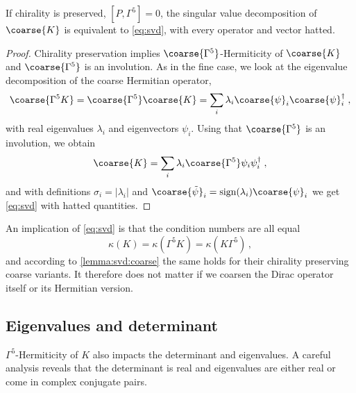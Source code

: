 \begin{lemma} \label{lemma:svd:coarse}
If chirality is preserved, $[P, \Gamma^5]=0$, the singular value decomposition of $\coarse{K}$ is equivalent to \cref{eq:svd}, with every operator and vector hatted.
\end{lemma}

\begin{proof}
Chirality preservation implies $\coarse{\Gamma^{5}}$-Hermiticity of $\coarse{K}$ and $\coarse{\Gamma^{5}}$ is an involution.
As in the fine case, we look at the eigenvalue decomposition of the coarse Hermitian operator,
\begin{equation}
\coarse{\Gamma^{5} K} = \coarse{\Gamma^{5}} \coarse{K} = \sum_{i} \lambda_i \coarse{\psi}_i \coarse{\psi}_i^{\dagger} \;,
\end{equation}
with real eigenvalues $\lambda_i$ and eigenvectors $\psi_i$. Using that $\coarse{\Gamma^{5}}$ is an involution, we obtain
\begin{equation}
\coarse{K} = \sum_{i} \lambda_i \coarse{\Gamma^{5}} \psi_i \psi_i^{\dagger} \;,
\end{equation}
and with definitions $\sigma_i = \lvert \lambda_i \rvert$ and $\coarse{\tilde{\psi}}_i = \text{sign}(\lambda_i) \coarse{\psi}_i$ we get \cref{eq:svd} with hatted quantities.
\end{proof}

An implication of \cref{eq:svd} is that the condition numbers are all equal
\begin{equation}
\kappa(K) = \kappa(\Gamma^{5} K) = \kappa(K \Gamma^{5}) \,,
\end{equation}
and according to \cref{lemma:svd:coarse} the same holds for their chirality preserving coarse variants.
It therefore does not matter if we coarsen the Dirac operator itself or its Hermitian version.

\subsection{Eigenvalues and determinant}

$\Gamma^{5}$-Hermiticity of $K$ also impacts the determinant and eigenvalues.
A careful analysis reveals that the determinant is real and eigenvalues are either real or come in complex conjugate pairs.


